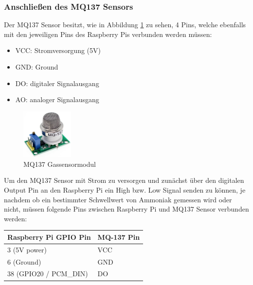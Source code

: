 \documentclass[conference]{IEEEtran}
\begin{document}
\subsubsection{Anschließen des MQ137 Sensors} 
Der MQ137 Sensor besitzt, wie in Abbildung \ref{mq137_pins} zu sehen, 4 Pins, welche ebenfalls mit den jeweiligen Pins des Raspberry Pis verbunden werden müssen:
\begin{itemize}
	\item VCC: Stromversorgung (5V)
	\item GND: Ground
	\item DO: digitaler Signalausgang
	\item AO: analoger Signalausgang
\end{itemize}
\begin{figure}[H]
	\centerline{\includegraphics[height=25mm]{fig/mq137_pins.png}}
	\caption{MQ137 Gassensormodul}
	\label{mq137_pins}
\end{figure}
Um den MQ137 Sensor mit Strom zu versorgen und zunächst über den digitalen Output Pin an den Raspberry Pi ein High bzw. Low Signal senden zu können, je nachdem ob ein bestimmter Schwellwert von Ammoniak gemessen wird oder nicht, müssen folgende Pins zwischen Raspberry Pi und MQ137 Sensor verbunden werden:
\begin{table}[h!]
	\centering
	\begin{tabular}{|p{4cm}|p{4cm}|}
		\hline
		\textbf{Raspberry Pi GPIO Pin} & \textbf{MQ-137 Pin} \\
		\hline
		3 (5V power) & VCC \\
		\cline{1-2}
		6 (Ground) & GND \\
		\cline{1-2}
		38 (GPIO20 / PCM\_DIN) & DO \\
		\hline
	\end{tabular}
\end{table}

\newpage
\end{document}
